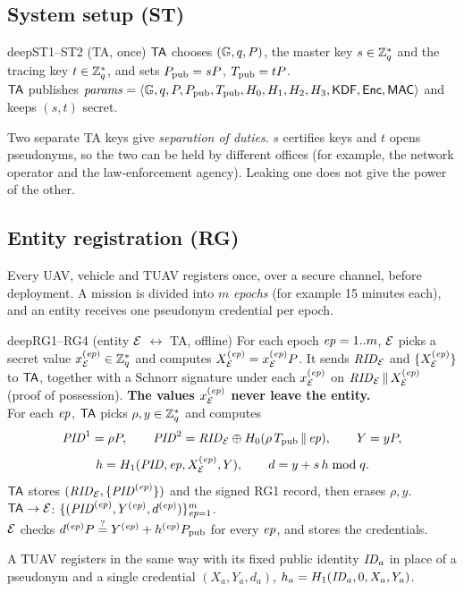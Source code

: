\subsection{System setup (ST)}
\begin{stepbox}{deep}{ST1--ST2 \;(TA, once)}
 $\mathsf{TA}$ chooses $(\mathbb{G},q,P)$, the master key $s\in\mathbb{Z}_q^{*}$ and the tracing key $t\in\mathbb{Z}_q^{*}$, and sets $P_{\mathrm{pub}}=sP$, $T_{\mathrm{pub}}=tP$.\\
 $\mathsf{TA}$ publishes $\mathit{params}=\langle \mathbb{G},q,P,P_{\mathrm{pub}},T_{\mathrm{pub}},H_0,H_1,H_2,H_3,\mathsf{KDF},\mathsf{Enc},\mathsf{MAC}\rangle$ and keeps $(s,t)$ secret.
\end{stepbox}
\begin{whybox}
Two separate TA keys give \emph{separation of duties}. $s$ certifies keys and $t$ opens pseudonyms, so the two can be held by different offices
(for example, the network operator and the law-enforcement agency). Leaking one does not give the power of the other.
\end{whybox}

\subsection{Entity registration (RG)}
Every UAV, vehicle and TUAV registers once, over a secure channel, before deployment. A mission is divided into $m$ \emph{epochs}
(for example 15 minutes each), and an entity receives one pseudonym credential per epoch.

\begin{stepbox}{deep}{RG1--RG4 \;(entity $\mathcal{E}$ $\leftrightarrow$ TA, offline)}
 For each epoch $\mathit{ep}=1..m$, $\mathcal{E}$ picks a secret value $x^{(\mathit{ep})}_{\mathcal{E}}\in\mathbb{Z}_q^{*}$ and computes $X^{(\mathit{ep})}_{\mathcal{E}}=x^{(\mathit{ep})}_{\mathcal{E}} P$.
It sends $\mathit{RID}_{\mathcal{E}}$ and $\{X^{(\mathit{ep})}_{\mathcal{E}}\}$ to $\mathsf{TA}$, together with a Schnorr signature under each $x^{(\mathit{ep})}_{\mathcal{E}}$ on $\mathit{RID}_{\mathcal{E}}\,\|\, X^{(\mathit{ep})}_{\mathcal{E}}$
(proof of possession). \textbf{The values $x^{(\mathit{ep})}_{\mathcal{E}}$ never leave the entity.}\\[2pt]
 For each $\mathit{ep}$, $\mathsf{TA}$ picks $\rho,y\in\mathbb{Z}_q^{*}$ and computes
\[
 \mathit{PID}^1=\rho P,\qquad \mathit{PID}^2=\mathit{RID}_{\mathcal{E}}\oplus H_0(\rho\,T_{\mathrm{pub}}\,\|\,\mathit{ep}),\qquad Y=yP,
\]
\[
 h=H_1(\mathit{PID},\mathit{ep},X^{(\mathit{ep})}_{\mathcal{E}},Y),\qquad d=y+s\,h \bmod q .
\]
$\mathsf{TA}$ stores $(\mathit{RID}_{\mathcal{E}},\{\mathit{PID}^{(\mathit{ep})}\})$ and the signed RG1 record, then erases $\rho,y$.\\[2pt]
 $\mathsf{TA}\to\mathcal{E}$: $\{(\mathit{PID}^{(\mathit{ep})},Y^{(\mathit{ep})},d^{(\mathit{ep})})\}_{\mathit{ep}=1}^{m}$.\\[2pt]
 $\mathcal{E}$ checks $d^{(\mathit{ep})}P\overset{?}{=}Y^{(\mathit{ep})}+h^{(\mathit{ep})}P_{\mathrm{pub}}$ for every $\mathit{ep}$, and stores the credentials.
\end{stepbox}
\noindent A TUAV registers in the same way with its fixed public identity $\mathit{ID}_a$ in place of a pseudonym and a single credential
$(X_a,Y_a,d_a)$, $h_a=H_1(\mathit{ID}_a,0,X_a,Y_a)$.

